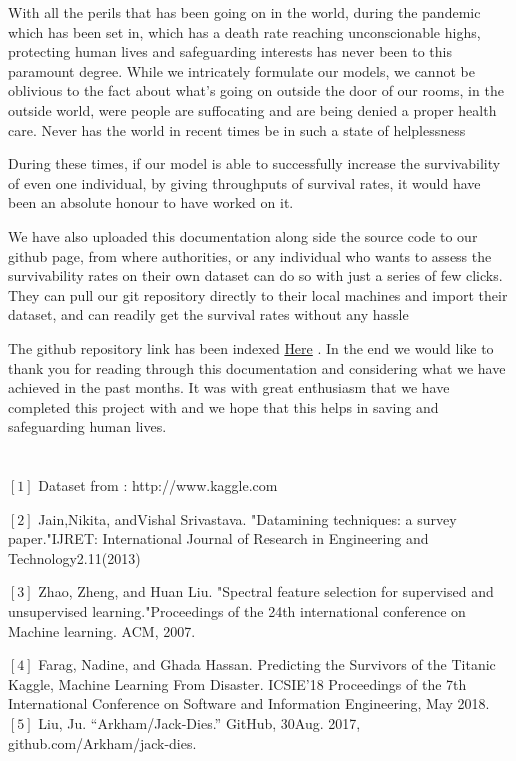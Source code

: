 \documentclass[12pt]{article}
\newcommand{\nd}{\noindent}
\newcommand{\secsize}{\fontsize{15pt}{12pt}\selectfont}
\begin{document}
\nd With all the perils that has been going on in the world, during the pandemic which has been set in, which has a death rate reaching unconscionable highs, protecting human lives and safeguarding interests has never been to this paramount degree. While we intricately formulate our models, we cannot be oblivious to the fact about what's going on outside the door of our rooms, in the outside world, were people are suffocating and are being denied a proper health care. Never has the world in recent times be in such a state of helplessness 

\nd During these times, if our model is able to successfully increase the survivability of even one individual, by giving throughputs of survival rates, it would have been an absolute honour to have worked on it. 

\nd We have also uploaded this documentation along side the source code to our github page, from where authorities, or any individual who wants to assess the survivability rates on their own dataset can do so with just a series of few clicks. They can pull our git repository directly to their local machines and import their dataset, and can readily get the survival rates without any hassle 

\nd The github repository link has been indexed \href{https://github.com/tanmayagarwal1/SurvivabilityPredictor}{Here} . In the end we would like to thank you for reading through this documentation and considering what we have achieved in the past months. It was with great enthusiasm that we have completed this project with and we hope that this helps in saving and safeguarding human lives. 

\nd 
\newpage 
\section{\textbf{\secsize{REFERENCES}}}
$[1]$ Dataset from : http://www.kaggle.com

\nd$[2]$  Jain,Nikita, andVishal Srivastava. "Datamining techniques: a survey paper."IJRET: International Journal of Research in Engineering and Technology2.11(2013)
 
\nd$[3]$ Zhao, Zheng, and Huan Liu. "Spectral feature selection for supervised and unsupervised learning."Proceedings of the 24th international conference on Machine learning. ACM, 2007.

\nd$[4]$  Farag, Nadine, and Ghada Hassan. Predicting the Survivors of the Titanic Kaggle, Machine Learning From Disaster. ICSIE'18 Proceedings of the 7th International Conference on Software and Information Engineering, May 2018.
\nd$[5]$  Liu, Ju. “Arkham/Jack-Dies.” GitHub, 30Aug. 2017, github.com/Arkham/jack-dies.
\end{document}
